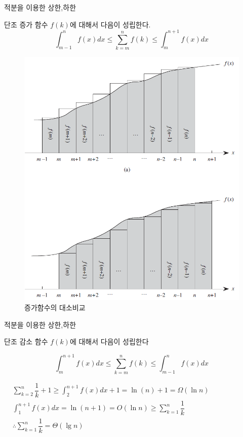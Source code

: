 \documentclass[10pt]{beamer}
\begin{document}
\begin{frame}{적분을 이용한 상한,하한}

    단조 증가 함수 $f(k)$에 대해서 다음이 성립한다.
    $$\int_{m-1}^{n}f(x)dx \le \sum_{k=m}^n f(k) \le \int_{m}^{n+1}f(x)dx$$
    
    \begin{figure}[h!]
        \centering
        \includegraphics[scale=0.5]{./QuickSort/pic/q5.png}
        \caption{증가함수의 대소비교\cite{reference1}}
    \end{figure}
    
\end{frame}


\begin{frame}{적분을 이용한 상한,하한}

    단조 감소 함수 $f(k)$에 대해서 다음이 성립한다

    $$ \int_{m}^{n+1}f(x)dx \le \sum_{k=m}^n f(k) \le\int_{m-1}^{n}f(x)dx $$

\end{frame}




\begin{frame}{}
$    
\begin{aligned}
        &\sum_{k=2}^n \dfrac{1}{k}+1 \ge \int_{2}^{n+1}f(x)dx +1= \ln (n)+1 = \Omega(\ln n) \\
        &\int_{1}^{n+1}f(x)dx =\ln (n+1) = O(\ln n) \ge \sum_{k=1}^n \dfrac{1}{k}  \\
        & \therefore  \sum_{k=1}^n \dfrac{1}{k} = \Theta(\lg n)
    \end{aligned}
$
\end{frame}
\end{document}
